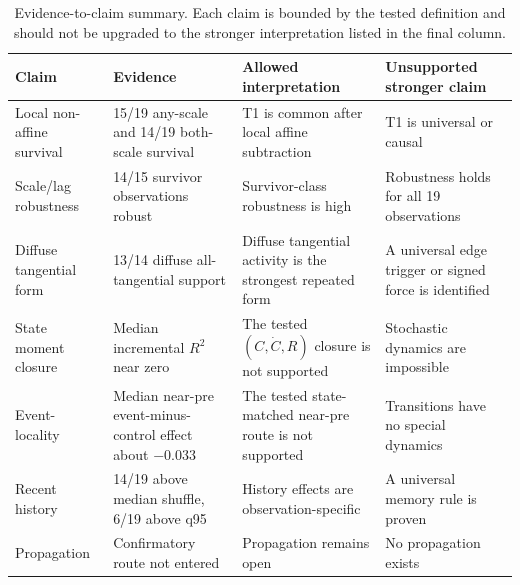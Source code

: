 \begin{table}[t]
\caption{Evidence-to-claim summary. Each claim is bounded by the tested
definition and should not be upgraded to the stronger interpretation listed in
the final column.}
\label{tab:evidence_claims}
\centering
\begingroup
\footnotesize
\setlength{\tabcolsep}{4pt}
\renewcommand{\arraystretch}{1.15}
\begin{tabular}{@{}p{}p{}p{}p{}@{}}
\toprule
Claim & Evidence & Allowed interpretation & Unsupported stronger claim \\
\midrule
Local non-affine survival & 15/19 any-scale and 14/19 both-scale survival & T1 is common after local affine subtraction & T1 is universal or causal \\
Scale/lag robustness & 14/15 survivor observations robust & Survivor-class robustness is high & Robustness holds for all 19 observations \\
Diffuse tangential form & 13/14 diffuse all-tangential support & Diffuse tangential activity is the strongest repeated form & A universal edge trigger or signed force is identified \\
State moment closure & Median incremental $R^2$ near zero & The tested $(C,\dot{C},R)$ closure is not supported & Stochastic dynamics are impossible \\
Event-locality & Median near-pre event-minus-control effect about $-0.033$ & The tested state-matched near-pre route is not supported & Transitions have no special dynamics \\
Recent history & 14/19 above median shuffle, 6/19 above q95 & History effects are observation-specific & A universal memory rule is proven \\
Propagation & Confirmatory route not entered & Propagation remains open & No propagation exists \\
\bottomrule
\end{tabular}
\endgroup
\end{table}
